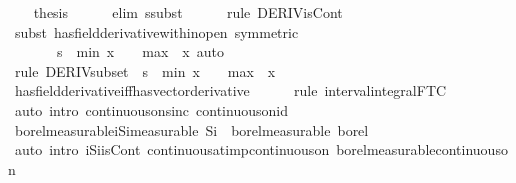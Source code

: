 \documentclass[leqno]{article}
\theoremstyle{definition}
\begin{document}
\begin{isabellebody}
\ \ \isamarkupfalse%
\ {\isacharquery}thesis\isanewline
\ \ \ \ \isamarkupfalse%
\ {\isacharparenleft}elim\ ssubst{\isacharparenright}\isanewline
\ \ \ \ \isamarkupfalse%
\ {\isacharparenleft}rule\ DERIV{\isacharunderscore}isCont{\isacharparenright}\isanewline
\ \ \ \ \isamarkupfalse%
\ {\isacharparenleft}subst\ has{\isacharunderscore}field{\isacharunderscore}derivative{\isacharunderscore}within{\isacharunderscore}open\ {\isacharbrackleft}symmetric{\isacharcomma}\ \isanewline
\ \ \ \ \ \ \ s\ {\isacharequal}\ {\isachardoublequoteopen}{\isacharbraceleft}{\isacharparenleft}min\ {\isacharparenleft}x\ {\isacharminus}\ {}{\isacharparenright}\ {\isacharparenleft}{\isacharminus}\ {}{\isacharparenright}{\isacharparenright}{\isacharless}{\isachardot}{\isachardot}{\isacharless}{\isacharparenleft}max\ {}\ {\isacharparenleft}x{\isacharplus}{}{\isacharparenright}{\isacharparenright}{\isacharbraceright}{\isachardoublequoteclose}{\isacharbrackright}{\isacharcomma}\ auto{\isacharparenright}\isanewline
\ \ \ \ \isamarkupfalse%
\ {\isacharparenleft}rule\ DERIV{\isacharunderscore}subset\ {\isacharbrackleft}\ s\ {\isacharequal}\ {\isachardoublequoteopen}{\isacharbraceleft}{\isacharparenleft}min\ {\isacharparenleft}x\ {\isacharminus}\ {}{\isacharparenright}\ {\isacharparenleft}{\isacharminus}\ {}{\isacharparenright}{\isacharparenright}{\isachardot}{\isachardot}{\isacharparenleft}max\ {}\ {\isacharparenleft}x{\isacharplus}{}{\isacharparenright}{\isacharparenright}{\isacharbraceright}{\isachardoublequoteclose}{\isacharbrackright}{\isacharparenright}\isanewline
\ \ \ \ \isamarkupfalse%
\ has{\isacharunderscore}field{\isacharunderscore}derivative{\isacharunderscore}iff{\isacharunderscore}has{\isacharunderscore}vector{\isacharunderscore}derivative\isanewline
\ \ \ \ \isamarkupfalse%
\ {\isacharparenleft}rule\ interval{\isacharunderscore}integral{\isacharunderscore}FTC{}{\isacharparenright}\isanewline
\ \ \ \ \isamarkupfalse%
\ {\isacharparenleft}auto\ intro{\isacharbang}{\isacharcolon}\ continuous{\isacharunderscore}on{\isacharunderscore}sinc\ continuous{\isacharunderscore}on{\isacharunderscore}id{\isacharparenright}\isanewline
{}\isamarkupfalse%
\isanewline
{}\isamarkupfalse%
\ borel{\isacharunderscore}measurable{\isacharunderscore}iSi{\isacharbrackleft}measurable{\isacharbrackright}{\isacharcolon}\ {\isachardoublequoteopen}Si\ {\isasymin}\ borel{\isacharunderscore}measurable\ borel{\isachardoublequoteclose}\isanewline
{}\isamarkupfalse%
\ {\isacharparenleft}auto\ intro{\isacharcolon}\ iSi{\isacharunderscore}isCont\ continuous{\isacharunderscore}at{\isacharunderscore}imp{\isacharunderscore}continuous{\isacharunderscore}on\ borel{\isacharunderscore}measurable{\isacharunderscore}continuous{\isacharunderscore}on{}{\isacharparenright}
\end{isabellebody}
\end{document}
